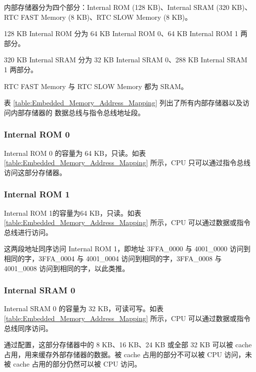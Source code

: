 \documentclass[main\_\_CN.tex]{subfiles}
\begin{document}
内部存储器分为四个部分：Internal ROM (128 KB)、Internal SRAM (320 KB)、RTC FAST Memory (8 KB)、RTC SLOW Memory (8 KB)。

128 KB Internal ROM 分为 64 KB Internal ROM 0、64 KB Internal ROM 1 两部分。

320 KB Internal SRAM 分为 32 KB Internal SRAM 0、288 KB Internal SRAM 1 两部分。

RTC FAST Memory 与 RTC SLOW Memory 都为 SRAM。

表 \ref{table:Embedded_Memory_Address_Mapping} 列出了所有内部存储器以及访问内部存储器的
数据总线与指令总线地址段。





\subsubsection{Internal ROM 0}

Internal ROM 0 的容量为 64 KB，只读。如表 \ref{table:Embedded_Memory_Address_Mapping} 所示，CPU 只可以通过指令总线访问这部分存储器。


\subsubsection{Internal ROM 1}

Internal ROM 1的容量为64 KB，只读。如表 \ref{table:Embedded_Memory_Address_Mapping} 所示，CPU 可以通过数据或指令总线进行访问。

这两段地址同序访问 Internal ROM 1，即地址 \hexprefix{}3FFA\_0000 与 \hexprefix{}4001\_0000 访问到相同的字，\hexprefix{}3FFA\_0004 与 \hexprefix{}4001\_0004 访问到相同的字，\hexprefix{}3FFA\_0008 与 \hexprefix{}4001\_0008 访问到相同的字，以此类推。


\subsubsection{Internal SRAM 0}\label{Internal SRAM 0}

Internal SRAM 0 的容量为 32 KB，可读可写。如表 \ref{table:Embedded_Memory_Address_Mapping} 所示，CPU 可以通过数据或指令总线同序访问。


\hypertarget{Cache}{}
通过配置，这部分存储器中的 8 KB、16 KB、24 KB 或全部 32 KB 可以被 cache  占用，用来缓存外部存储器的数据。被 cache 占用的部分不可以被 CPU 访问，未被 cache 占用的部分仍然可以被 CPU 访问。
\end{document}
